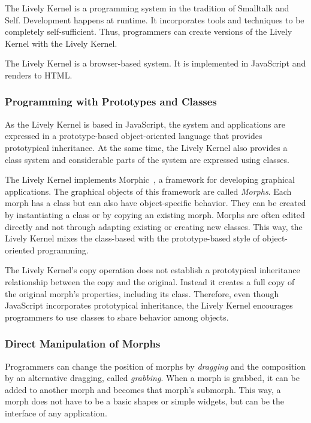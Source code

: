 The Lively Kernel is a programming system in the tradition of Smalltalk and Self.
Development happens at runtime.
It incorporates tools and techniques to be completely self-sufficient.
Thus, programmers can create versions of the Lively Kernel with the Lively Kernel.

The Lively Kernel is a browser-based system.
It is implemented in JavaScript and renders to \ac{HTML}.

\subsubsection{Programming with Prototypes and Classes}

As the Lively Kernel is based in JavaScript, the system and applications are expressed in a prototype-based object-oriented language that provides prototypical inheritance.
At the same time, the Lively Kernel also provides a class system and considerable parts of the system are expressed using classes.

The Lively Kernel implements Morphic~\cite{Maloney1995Mor}, a framework for developing graphical applications.
The graphical objects of this framework are called \emph{Morphs}.
Each morph has a class but can also have object-specific behavior.
They can be created by instantiating a class or by copying an existing morph.
Morphs are often edited directly and not through adapting existing or creating new classes.
This way, the Lively Kernel mixes the class-based with the prototype-based style of object-oriented programming.

The Lively Kernel's copy operation does not establish a prototypical inheritance relationship between the copy and the original.
Instead it creates a full copy of the original morph's properties, including its class.
Therefore, even though JavaScript incorporates prototypical inheritance, the Lively Kernel encourages programmers to use classes to share behavior among objects.

\subsubsection{Direct Manipulation of Morphs}

Programmers can change the position of morphs by \emph{dragging} and the composition by an alternative dragging, called \emph{grabbing}.
When a morph is grabbed, it can be added to another morph and becomes that morph's submorph.
This way, a morph does not have to be a basic shapes or simple widgets, but can be the interface of any application.

